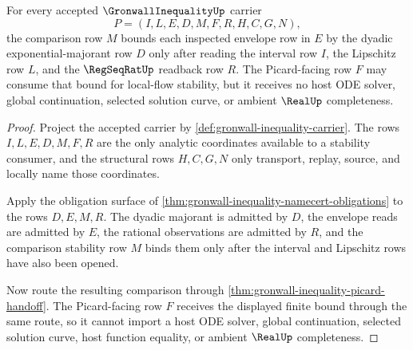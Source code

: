 \begin{theorem}
\label{thm:gronwall-inequality-finite-integral-bound}
For every accepted $\GronwallInequalityUp$ carrier
$$
P=(I,L,E,D,M,F,R,H,C,G,N),
$$
the comparison row $M$ bounds each inspected envelope row in $E$ by the dyadic exponential-majorant row $D$ only after reading the interval row $I$, the Lipschitz row $L$, and the $\RegSeqRatUp$ readback row $R$. The Picard-facing row $F$ may consume that bound for local-flow stability, but it receives no host ODE solver, global continuation, selected solution curve, or ambient $\RealUp$ completeness.
\end{theorem}
\begin{proof}
Project the accepted carrier by \autoref{def:gronwall-inequality-carrier}. The rows $I,L,E,D,M,F,R$ are the only analytic coordinates available to a stability consumer, and the structural rows $H,C,G,N$ only transport, replay, source, and locally name those coordinates.

Apply the obligation surface of \autoref{thm:gronwall-inequality-namecert-obligations} to the rows $D,E,M,R$. The dyadic majorant is admitted by $D$, the envelope reads are admitted by $E$, the rational observations are admitted by $R$, and the comparison stability row $M$ binds them only after the interval and Lipschitz rows have also been opened.

Now route the resulting comparison through \autoref{thm:gronwall-inequality-picard-handoff}. The Picard-facing row $F$ receives the displayed finite bound through the same route, so it cannot import a host ODE solver, global continuation, selected solution curve, host function equality, or ambient $\RealUp$ completeness.
\end{proof}



